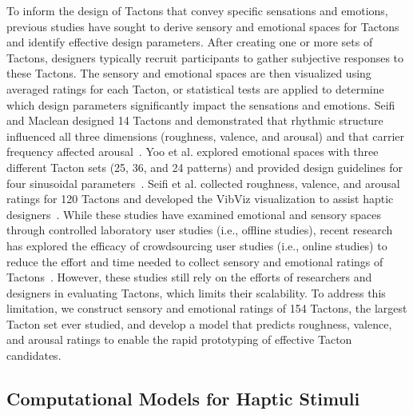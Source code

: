 To inform the design of Tactons that convey specific sensations and emotions, previous studies have sought to derive sensory and emotional spaces for Tactons and identify effective design parameters.
After creating one or more sets of Tactons, designers typically recruit participants to gather subjective responses to these Tactons.
The sensory and emotional spaces are then visualized using averaged ratings for each Tacton, or statistical tests are applied to determine which design parameters significantly impact the sensations and emotions.
Seifi and Maclean designed 14 Tactons and demonstrated that rhythmic structure influenced all three dimensions (roughness, valence, and arousal) and that carrier frequency affected arousal~\cite{seifi2013first}.
Yoo et al. explored emotional spaces with three different Tacton sets (25, 36, and 24 patterns) and provided design guidelines for four sinusoidal parameters~\cite{yoo2015emotional}.
Seifi et al. collected roughness, valence, and arousal ratings for 120 Tactons and developed the VibViz visualization to assist haptic designers~\cite{seifi2015vibviz}.
While these studies have examined emotional and sensory spaces through controlled laboratory user studies (i.e., offline studies), recent research has explored the efficacy of crowdsourcing user studies (i.e., online studies) to reduce the effort and time needed to collect sensory and emotional ratings of Tactons~\cite{schneider2016hapturk, lim4785071emotional}. 
However, these studies still rely on the efforts of researchers and designers in evaluating Tactons, which limits their scalability.
To address this limitation, we construct sensory and emotional ratings of 154 Tactons, the largest Tacton set ever studied, and develop a model that predicts roughness, valence, and arousal ratings to enable the rapid prototyping of effective Tacton candidates.


\subsection{Computational Models for Haptic Stimuli}

